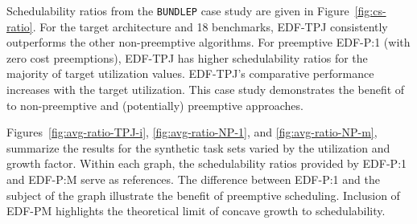 \documentclass[a4paper,UKenglish,cleveref,autoref,english]{lipics-v2019}
\newcommand{\bundlep}{\texttt{BUNDLEP}}
\begin{document}
Schedulability ratios from the \bundlep{} case study are given in
Figure~\ref{fig:cs-ratio}. For the target architecture and 18 benchmarks, EDF-TPJ consistently outperforms the other non-preemptive
algorithms. For preemptive EDF-P:1 (with zero cost preemptions), EDF-TPJ
has higher schedulability ratios for the majority of target
utilization values. EDF-TPJ's comparative performance increases
with the target utilization. This case study demonstrates the benefit
of \tpj{} to non-preemptive and (potentially) preemptive approaches.
 
Figures~\ref{fig:avg-ratio-TPJ-i}, \ref{fig:avg-ratio-NP-1}, and \ref{fig:avg-ratio-NP-m}, summarize the results for the synthetic
task sets varied by the utilization and growth factor. Within
each graph, the schedulability ratios provided by EDF-P:1 and EDF-P:M serve as
references. The difference between EDF-P:1 and the subject of the
graph illustrate the benefit of preemptive scheduling. Inclusion of
EDF-PM highlights the theoretical limit of concave growth to
schedulability.
\end{document}

